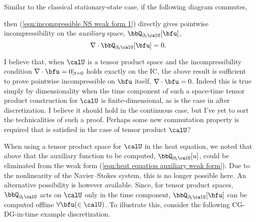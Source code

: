     Similar to the classical stationary-state case, if the following diagram commutes,
    \begin{center}\end{center}
    then (\ref{eqn:incompressible NS weak form 1}) directly gives pointwise incompressibility on the \emph{auxiliary} space, $\bbQ_{\partial_{t}\calU}[\bfu]$,
    \begin{equation}
        \nabla\cdot\bbQ_{\partial_{t}\calU}[\bfu]  =  0.
    \end{equation}
    
    \begin{remark}
        I believe that, when $\calU$ is a tensor product space and the incompressibility condition $\nabla\cdot\bfu  =  0|_{t = 0}$ holds exactly on the IC, the above result is sufficient to prove pointwise incompressible on $\bfu$ itself, $\nabla\cdot\bfu = 0$. Indeed this is true simply by dimensionality when the time component of such a space-time tensor product construction for $\calU$ is finite-dimensional, as is the case in after discretization. I believe it should hold in the continuous case, but I've yet to sort the technicalities of such a proof. Perhaps some new commutation property is required that is satisfied in the case of tensor product $\calU$?
    \end{remark}

    When using a tensor product space for $\calU$ in the heat equation, we noted that above that the auxiliary function to be computed, $\bbQ_{\partial_{t}\calU}[u]$, could be eliminated from the weak form (\ref{eqn:heat equation auxiliary weak form}). Due to the nonlinearity of the Navier--Stokes system, this is no longer possible here. An alternative possibility is however available. Since, for tensor product spaces, $\bbQ_{\partial_{t}\calU}$ acts on $\calU$ only in the time component, $\bbQ_{\partial_{t}\calU}[\bfu]$ can be computed offline $\forall \bfu (\in \calU)$. To illustrate this, consider the following CG-DG-in-time example discretization.
    
